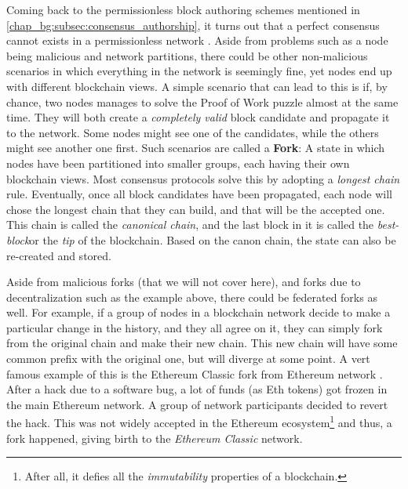 Coming back to the permissionless block authoring schemes mentioned in
\ref{chap_bg:subsec:consensus_authorship}, it turns out that a perfect consensus cannot exists in a
permissionless network \cite{survey_consensus_Wang_Hoang_Hu_Xiong2019}. Aside from problems such as
a node being malicious and network partitions, there could be other non-malicious scenarios in which
everything in the network is seemingly fine, yet nodes end up with different blockchain views. A
simple scenario that can lead to this is if, by chance, two nodes manages to solve the Proof of Work
puzzle almost at the same time. They will both create a \textit{completely valid} block candidate
and propagate it to the network. Some nodes might see one of the candidates, while the others might
see another one first. Such scenarios are called a \textbf{Fork}: A state in which nodes have been
partitioned into smaller groups, each having their own blockchain views. Most consensus protocols
solve this by adopting a \textit{longest chain} rule. Eventually, once all block candidates have
been propagated, each node will chose the longest chain that they can build, and that will be the
accepted one. This chain is called the \textit{canonical chain}, and the last block in it is called
the \textit{best-block}or the \textit{tip} of the blockchain. Based on the canon chain, the state
can also be re-created and stored.

Aside from malicious forks (that we will not cover here), and forks due to decentralization such as
the example above, there could be federated forks as well. For example, if a group of nodes in a
blockchain network decide to make a particular change in the history, and they all agree on it, they
can simply fork from the original chain and make their new chain. This new chain will have some
common prefix with the original one, but will diverge at some point. A vert famous example of this
is the Ethereum Classic fork from Ethereum network \cite{dao_hack}. After a hack due to a software
bug, a lot of funds (as Eth tokens) got frozen in the main Ethereum network. A group of network
participants decided to revert the hack. This was not widely accepted in the Ethereum
ecosystem\footnote{After all, it defies all the \textit{immutability} properties of a blockchain.}
and thus, a fork happened, giving birth to the \textit{Ethereum Classic} network.


